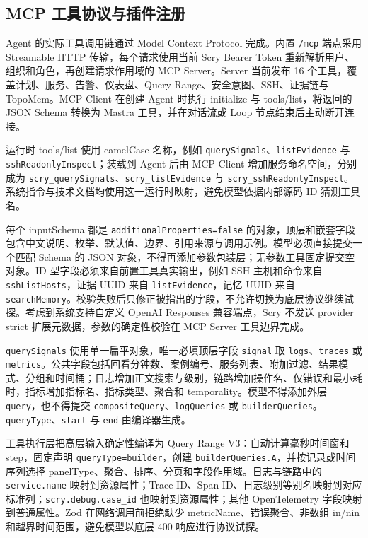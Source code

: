 \documentclass[conference,10pt]{IEEEtran}
\newcommand{\code}[1]{\texttt{#1}}
\begin{document}
\subsection{MCP 工具协议与插件注册}

Agent 的实际工具调用链通过 Model Context Protocol 完成。内置 \code{/mcp} 端点采用 Streamable HTTP 传输，每个请求使用当前 Scry Bearer Token 重新解析用户、组织和角色，再创建请求作用域的 MCP Server。Server 当前发布 16 个工具，覆盖计划、服务、告警、仪表盘、Query Range、安全意图、SSH、证据链与 TopoMem。MCP Client 在创建 Agent 时执行 initialize 与 tools/list，将返回的 JSON Schema 转换为 Mastra 工具，并在对话流或 Loop 节点结束后主动断开连接。

运行时 tools/list 使用 camelCase 名称，例如 \code{querySignals}、\code{listEvidence} 与 \code{sshReadonlyInspect}；装载到 Agent 后由 MCP Client 增加服务命名空间，分别成为 \code{scry\_querySignals}、\code{scry\_listEvidence} 与 \code{scry\_sshReadonlyInspect}。系统指令与技术文档均使用这一运行时映射，避免模型依据内部源码 ID 猜测工具名。

每个 inputSchema 都是 \code{additionalProperties=false} 的对象，顶层和嵌套字段包含中文说明、枚举、默认值、边界、引用来源与调用示例。模型必须直接提交一个匹配 Schema 的 JSON 对象，不得再添加参数包装层；无参数工具固定提交空对象。ID 型字段必须来自前置工具真实输出，例如 SSH 主机和命令来自 \code{sshListHosts}，证据 UUID 来自 \code{listEvidence}，记忆 UUID 来自 \code{searchMemory}。校验失败后只修正被指出的字段，不允许切换为底层协议继续试探。考虑到系统支持自定义 OpenAI Responses 兼容端点，Scry 不发送 provider strict 扩展元数据，参数的确定性校验在 MCP Server 工具边界完成。

\code{querySignals} 使用单一扁平对象，唯一必填顶层字段 \code{signal} 取 \code{logs}、\code{traces} 或 \code{metrics}。公共字段包括回看分钟数、案例编号、服务列表、附加过滤、结果模式、分组和时间桶；日志增加正文搜索与级别，链路增加操作名、仅错误和最小耗时，指标增加指标名、指标类型、聚合和 temporality。模型不得添加外层 \code{query}，也不得提交 \code{compositeQuery}、\code{logQueries} 或 \code{builderQueries}。\code{queryType}、\code{start} 与 \code{end} 由编译器生成。

工具执行层把高层输入确定性编译为 Query Range V3：自动计算毫秒时间窗和 step，固定声明 \code{queryType=builder}，创建 \code{builderQueries.A}，并按记录或时间序列选择 panelType、聚合、排序、分页和字段作用域。日志与链路中的 \code{service.name} 映射到资源属性；Trace ID、Span ID、日志级别等别名映射到对应标准列；\code{scry.debug.case\_id} 也映射到资源属性；其他 OpenTelemetry 字段映射到普通属性。Zod 在网络调用前拒绝缺少 metricName、错误聚合、非数组 in/nin 和越界时间范围，避免模型以底层 400 响应进行协议试探。
\end{document}
